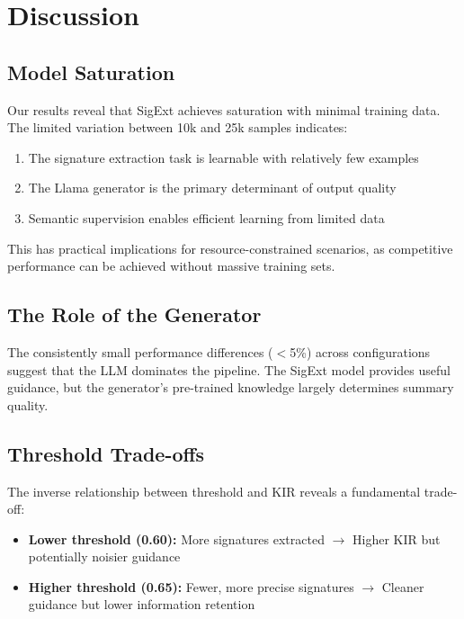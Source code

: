 \documentclass[conference]{IEEEtran}
\begin{document}
\section{Discussion}

\subsection{Model Saturation}

Our results reveal that SigExt achieves saturation with minimal training data. The limited variation between 10k and 25k samples indicates:

\begin{enumerate}
    \item The signature extraction task is learnable with relatively few examples
    \item The Llama generator is the primary determinant of output quality
    \item Semantic supervision enables efficient learning from limited data
\end{enumerate}

This has practical implications for resource-constrained scenarios, as competitive performance can be achieved without massive training sets.

\subsection{The Role of the Generator}

The consistently small performance differences ($<$5\%) across configurations suggest that the LLM dominates the pipeline. The SigExt model provides useful guidance, but the generator's pre-trained knowledge largely determines summary quality.

\subsection{Threshold Trade-offs}

The inverse relationship between threshold and KIR reveals a fundamental trade-off:
\begin{itemize}
    \item \textbf{Lower threshold (0.60):} More signatures extracted $\rightarrow$ Higher KIR but potentially noisier guidance
    \item \textbf{Higher threshold (0.65):} Fewer, more precise signatures $\rightarrow$ Cleaner guidance but lower information retention
\end{itemize}
\end{document}

